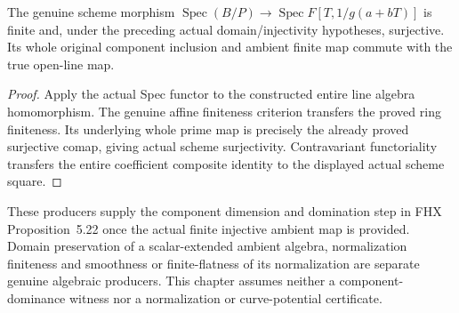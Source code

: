 \begin{theorem}
\label{algebra:line-component-scheme-domination}
\leanok
{}
The genuine scheme morphism
$\operatorname{Spec}(B/P)\to\operatorname{Spec}F[T,1/g(a+bT)]$
is finite and, under the preceding actual domain/injectivity hypotheses,
surjective. Its whole original component inclusion and ambient finite
map commute with the true open-line map.
\end{theorem}
\begin{proof}
Apply the actual Spec functor to the constructed entire line algebra
homomorphism. The genuine affine finiteness criterion transfers the
proved ring finiteness. Its underlying whole prime map is precisely
the already proved surjective comap, giving actual scheme surjectivity.
Contravariant functoriality transfers the entire coefficient composite
identity to the displayed actual scheme square.
\end{proof}

These producers supply the component dimension and domination step in
FHX Proposition~5.22 once the actual finite injective ambient map is
provided. Domain preservation of a scalar-extended ambient algebra,
normalization finiteness and smoothness or finite-flatness of its
normalization are separate genuine algebraic producers. This chapter
assumes neither a component-dominance witness nor a normalization or
curve-potential certificate.
